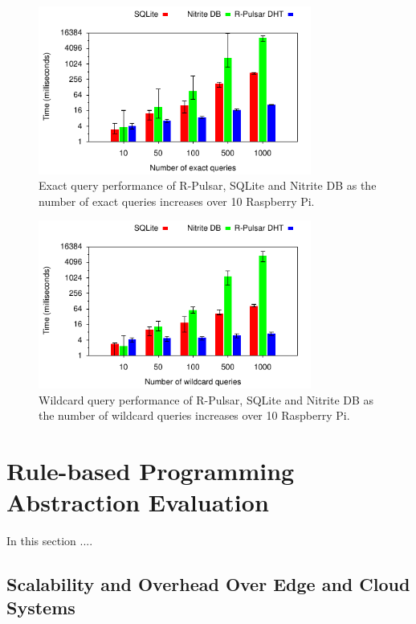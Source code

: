 \begin{figure}[h!]
  \centering
  \includegraphics[width=0.8\textwidth]{Results/DBExactBar}
  \caption{Exact query performance of R-Pulsar, SQLite and Nitrite DB as the number of exact queries increases over 10 Raspberry Pi.}
  \label{fig:DBExactBar}
\end{figure}

\begin{figure}[h!]
  \centering
  \includegraphics[width=0.8\textwidth]{Results/DBWildBar}
  \caption{Wildcard query performance of R-Pulsar, SQLite and Nitrite DB as the number of wildcard queries increases over 10 Raspberry Pi.}
  \label{fig:DBWildBar}
\end{figure}


\section{Rule-based Programming Abstraction Evaluation}

In this section ....

\subsection{Scalability and Overhead Over Edge and Cloud Systems}


